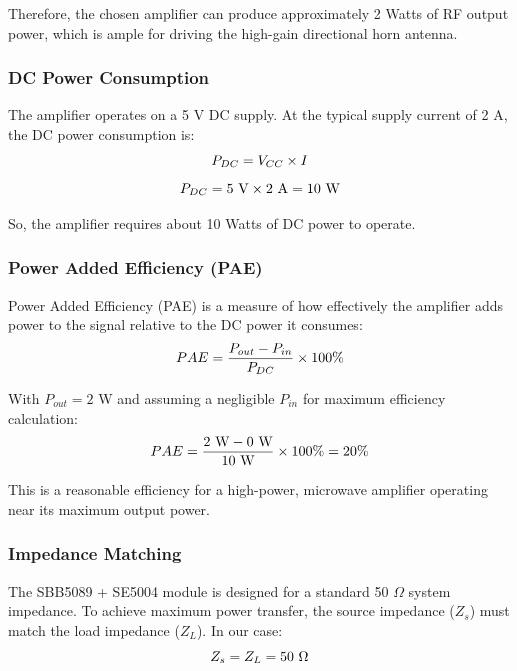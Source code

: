 \documentclass[12pt,a4paper]{report}
\begin{document}
	Therefore, the chosen amplifier can produce approximately 2 Watts of RF output power, which is ample for driving the high-gain directional horn antenna.
	
	\subsubsection{DC Power Consumption}
	The amplifier operates on a 5 V DC supply. At the typical supply current of 2 A, the DC power consumption is:
	\begingroup
	\setlength{\mathindent}{0pt}
	\begin{equation*}
		\hfill
		P_{DC} = V_{CC} \times I
		\hfill
	\end{equation*}
	\endgroup
	\begingroup
	\setlength{\mathindent}{0pt}
	\begin{equation*}
		\hfill
		P_{DC} = 5\ \text{V} \times 2\ \text{A} = 10\ \text{W}
		\hfill
	\end{equation*}
	\endgroup
	
	So, the amplifier requires about 10 Watts of DC power to operate.
	\subsubsection{Power Added Efficiency (PAE)}
	Power Added Efficiency (PAE) is a measure of how effectively the amplifier adds power to the signal relative to the DC power it consumes:
	\begingroup
	\setlength{\mathindent}{0pt}
	\begin{equation*}
		\hfill
		PAE = \frac{P_{out} - P_{in}}{P_{DC}} \times 100\%
		\hfill
	\end{equation*}
	\endgroup
	
	With $P_{out} = 2$ W and assuming a negligible $P_{in}$ for maximum efficiency calculation:
	\begingroup
	\setlength{\mathindent}{0pt}
	\begin{equation*}
		\hfill
		PAE = \frac{2\ \text{W} - 0\ \text{W}}{10\ \text{W}} \times 100\% = 20\%
		\hfill
	\end{equation*}
	\endgroup
	
	This is a reasonable efficiency for a high-power, microwave amplifier operating near its maximum output power.
	\subsubsection{Impedance Matching}
	The SBB5089 + SE5004 module is designed for a standard 50 $\Omega$ system impedance. To achieve maximum power transfer, the source impedance ($Z_s$) must match the load impedance ($Z_L$). In our case:
	\begingroup
	\setlength{\mathindent}{0pt}
	\begin{equation*}
		\hfill
		Z_s = Z_L = 50\ \Omega
		\hfill
	\end{equation*}
	\endgroup
	
\end{document}
